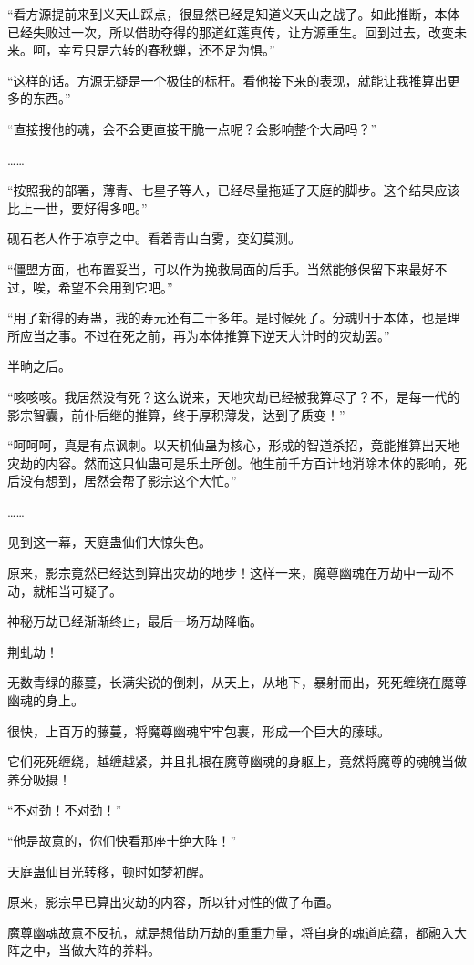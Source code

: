 \begin{this_body}
“看方源提前来到义天山踩点，很显然已经是知道义天山之战了。如此推断，本体已经失败过一次，所以借助夺得的那道红莲真传，让方源重生。回到过去，改变未来。呵，幸亏只是六转的春秋蝉，还不足为惧。”

“这样的话。方源无疑是一个极佳的标杆。看他接下来的表现，就能让我推算出更多的东西。”

“直接搜他的魂，会不会更直接干脆一点呢？会影响整个大局吗？”

……

“按照我的部署，薄青、七星子等人，已经尽量拖延了天庭的脚步。这个结果应该比上一世，要好得多吧。”

砚石老人作于凉亭之中。看着青山白雾，变幻莫测。

“僵盟方面，也布置妥当，可以作为挽救局面的后手。当然能够保留下来最好不过，唉，希望不会用到它吧。”

“用了新得的寿蛊，我的寿元还有二十多年。是时候死了。分魂归于本体，也是理所应当之事。不过在死之前，再为本体推算下逆天大计时的灾劫罢。”

半晌之后。

“咳咳咳。我居然没有死？这么说来，天地灾劫已经被我算尽了？不，是每一代的影宗智囊，前仆后继的推算，终于厚积薄发，达到了质变！”

“呵呵呵，真是有点讽刺。以天机仙蛊为核心，形成的智道杀招，竟能推算出天地灾劫的内容。然而这只仙蛊可是乐土所创。他生前千方百计地消除本体的影响，死后没有想到，居然会帮了影宗这个大忙。”

……

见到这一幕，天庭蛊仙们大惊失色。

原来，影宗竟然已经达到算出灾劫的地步！这样一来，魔尊幽魂在万劫中一动不动，就相当可疑了。

神秘万劫已经渐渐终止，最后一场万劫降临。

荆虬劫！

无数青绿的藤蔓，长满尖锐的倒刺，从天上，从地下，暴射而出，死死缠绕在魔尊幽魂的身上。

很快，上百万的藤蔓，将魔尊幽魂牢牢包裹，形成一个巨大的藤球。

它们死死缠绕，越缠越紧，并且扎根在魔尊幽魂的身躯上，竟然将魔尊的魂魄当做养分吸摄！

“不对劲！不对劲！”

“他是故意的，你们快看那座十绝大阵！”

天庭蛊仙目光转移，顿时如梦初醒。

原来，影宗早已算出灾劫的内容，所以针对性的做了布置。

魔尊幽魂故意不反抗，就是想借助万劫的重重力量，将自身的魂道底蕴，都融入大阵之中，当做大阵的养料。


\end{this_body}
